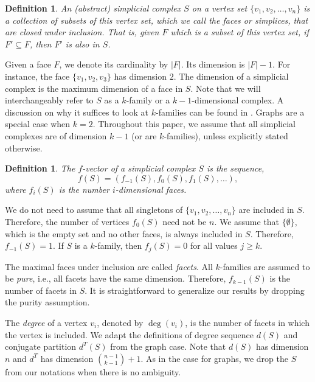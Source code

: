 \documentclass[11pt]{article}
\newtheorem{defi}[lm]{Definition}
\begin{document}
\begin{defi}
An \emph{(abstract) simplicial complex} $S$ on a vertex set $\{v_1, v_2, \ldots, v_n\}$ is a collection of subsets of this vertex set, which we call the \emph{faces} or \emph{simplices}, that are closed under inclusion. That is, given $F$ which is a subset of this vertex set, if $F' \subseteq F$, then $F'$ is also in $S$.
\end{defi}

Given a face $F$, we denote its cardinality by $|F|$. Its dimension is $|F| - 1$. For instance, the face $\{v_1, v_2, v_3\}$ has dimension $2$. The dimension of a simplicial complex is the maximum dimension of a face in $S$. Note that we will interchangeably refer to $S$ as a $k$-family or a $k-1$-dimensional complex. A discussion on why it suffices to look at $k$-families can be found in \cite{DR}. Graphs are a special case when $k = 2$. Throughout this paper, we assume that all simplicial complexes are of dimension $k-1$ (or are $k$-families), unless explicitly stated otherwise.



\begin{defi}
The $f$-vector of a simplicial complex $S$ is the sequence,
$$f(S) = (f_{-1}(S), f_{0}(S), f_1(S), \ldots ), $$
where $f_i(S)$ is the number $i$-dimensional faces.
\end{defi}

We do not need to assume that all singletons of $\{v_1, v_2, \ldots, v_n\}$ are included in $S$. Therefore, the number of vertices $f_0(S)$ need not be $n$. We assume that $\{\emptyset\}$, which is the empty set and no other faces, is always included in $S$. Therefore, $f_{-1}(S) = 1$. If $S$ is a $k$-family, then $f_j(S) = 0$ for all values $j \geq k$.

The maximal faces under inclusion are called \emph{facets}. All $k$-families are assumed to be \emph{pure}, i.e., all facets have the same dimension. Therefore, $f_{k-1}(S)$ is the number of facets in $S$. It is straightforward to generalize our results by dropping the purity assumption.

The \emph{degree} of a vertex $v_i$, denoted by $\deg(v_i)$, is the number of facets in which the vertex is included. We adapt the definitions of degree sequence $d(S)$ and conjugate partition $d^T(S)$ from the graph case. Note that $d(S)$ has dimension $n$ and $d^T$ has dimension $\binom{n - 1}{k - 1} +1$. As in the case for graphs, we drop the $S$ from our notations when there is no ambiguity.
\end{document}
